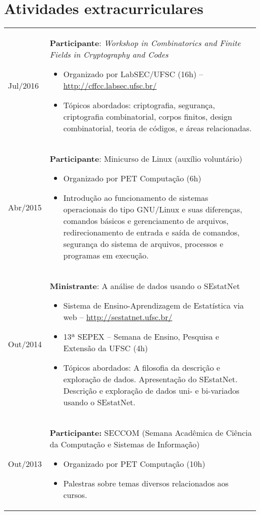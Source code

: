 \documentclass{article}
\newenvironment{contenttable}[1]{
    \section*{#1}
    \newcolumntype{L}{>{\bf \raggedleft}p{0.13\textwidth}}
    \newcolumntype{R}{p{0.82\textwidth}}
    \begin{tabular}{L!{\color{lightgray} \vrule}R}
}{
    \end{tabular}
}
\newenvironment{smallitem}{
    \vspace{-2mm}
    \begin{itemize}
    \setlength{\parskip}{0pt}
    \setlength{\itemsep}{2pt}
}{
    \vspace{-2mm}
    \end{itemize}
}
\begin{document}
\begin{contenttable}{Atividades extracurriculares}
    Jul/2016 & \textbf{Participante}: \emph{Workshop in Combinatorics and
        Finite Fields in Cryptography and Codes}
    \begin{smallitem}
        \item Organizado por LabSEC/UFSC (16h) --
        \url{http://cffcc.labsec.ufsc.br/}
        \item Tópicos abordados: criptografia, segurança, criptografia
        combinatorial, corpos finitos, design combinatorial, teoria
        de códigos, e áreas relacionadas.
    \end{smallitem} \\

    Abr/2015 & \textbf{Participante}: Minicurso de Linux (auxílio voluntário)
    \begin{smallitem}
        \item Organizado por PET Computação (6h)
        \item Introdução ao funcionamento de sistemas operacionais do tipo
        GNU/Linux e suas diferenças, comandos básicos e gerenciamento de
        arquivos, redirecionamento de entrada e saída de comandos, segurança
        do sistema de arquivos, processos e programas em execução.
    \end{smallitem} \\

    Out/2014 & \textbf{Ministrante}: A análise de dados usando o SEstatNet
    \begin{smallitem}
        \item Sistema de Ensino-Aprendizagem de Estatística via web --
        \url{http://sestatnet.ufsc.br/}
        \item 13ª SEPEX – Semana de Ensino, Pesquisa e Extensão da UFSC (4h)
        \item Tópicos abordados: A filosofia da descrição e exploração de
        dados. Apresentação do SEstatNet. Descrição e exploração de dados uni-
        e bi-variados usando o SEstatNet.
    \end{smallitem} \\

    Out/2013 & \textbf{Participante:} SECCOM {\small (Semana Acadêmica de
        Ciência da Computação e Sistemas de Informação)}
    \begin{smallitem}
        \item Organizado por PET Computação (10h)
        \item Palestras sobre temas diversos relacionados aos cursos.
    \end{smallitem}
\end{contenttable}
\end{document}
